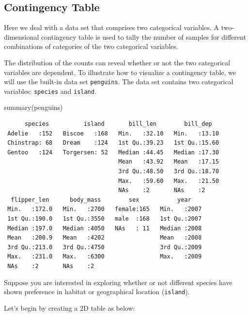 \documentclass[
  letterpaper,
  DIV=11,
  numbers=noendperiod]{scrreprt}
\newenvironment{Shaded}{\begin{snugshade}}{\end{snugshade}}
\newcommand{\FunctionTok}[1]{\textcolor[rgb]{0.28,0.35,0.67}{#1}}
\newcommand{\NormalTok}[1]{\textcolor[rgb]{0.00,0.23,0.31}{#1}}
\begin{document}
\subsection{Contingency Table}\label{sec-03-contingency-table}

Here we deal with a data set that comprises two categorical variables. A
two-dimensional contingency table is used to tally the number of samples
for different combinations of categories of the two categorical
variables.

The distribution of the counts can reveal whether or not the two
categorical variables are dependent. To illustrate how to visualize a
contingency table, we will use the built-in data set \texttt{penguins}.
The data set contains two categorical variables: \texttt{species} and
\texttt{island}.

\begin{Shaded}
\begin{Highlighting}[]
\FunctionTok{summary}\NormalTok{(penguins)}
\end{Highlighting}
\end{Shaded}

\begin{verbatim}
      species          island       bill_len        bill_dep    
 Adelie   :152   Biscoe   :168   Min.   :32.10   Min.   :13.10  
 Chinstrap: 68   Dream    :124   1st Qu.:39.23   1st Qu.:15.60  
 Gentoo   :124   Torgersen: 52   Median :44.45   Median :17.30  
                                 Mean   :43.92   Mean   :17.15  
                                 3rd Qu.:48.50   3rd Qu.:18.70  
                                 Max.   :59.60   Max.   :21.50  
                                 NAs    :2       NAs    :2      
  flipper_len      body_mass        sex           year     
 Min.   :172.0   Min.   :2700   female:165   Min.   :2007  
 1st Qu.:190.0   1st Qu.:3550   male  :168   1st Qu.:2007  
 Median :197.0   Median :4050   NAs   : 11   Median :2008  
 Mean   :200.9   Mean   :4202                Mean   :2008  
 3rd Qu.:213.0   3rd Qu.:4750                3rd Qu.:2009  
 Max.   :231.0   Max.   :6300                Max.   :2009  
 NAs    :2       NAs    :2                                 
\end{verbatim}

Suppose you are interested in exploring whether or not different species
have shown preference in habitat or geographical location
(\texttt{island}).

Let's begin by creating a 2D table as below:
\end{document}
